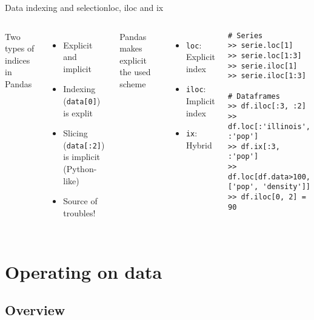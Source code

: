 \documentclass[10pt,compress]{beamer} %
\begin{document}
\begin{frame}[fragile]{Data indexing and selection}{loc, iloc and ix}
	\begin{columns}
	Two types of indices in Pandas
	\begin{itemize}
		\item Explicit and implicit
		\item Indexing (\texttt{data[0]}) is explit
		\item Slicing (\texttt{data[:2]}) is implicit (Python-like)
		\item Source of troubles!
	\end{itemize}
	Pandas makes explicit the used scheme
	\begin{itemize}
		\item \texttt{loc}: Explicit index
		\item \texttt{iloc}: Implicit index
		\item \texttt{ix}: Hybrid
	\end{itemize}
		\begin{exampleblock}{}
		\vspace{-0.2cm} 
			\begin{lstlisting}
# Series
>> serie.loc[1]
>> serie.loc[1:3]
>> serie.iloc[1]
>> serie.iloc[1:3]

# Dataframes
>> df.iloc[:3, :2]
>> df.loc[:'illinois', :'pop']
>> df.ix[:3, :'pop']
>> df.loc[df.data>100, ['pop', 'density']]
>> df.iloc[0, 2] = 90
\end{lstlisting}
		\end{exampleblock}
	\end{columns}
\end{frame}

\section{Operating on data}
\subsection{Overview}
\end{document}
